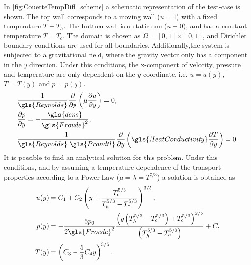 In \cref{fig:CouetteTempDiff_scheme} a schematic representation of the test-case is shown. The top wall corresponds to a moving wall ($u = 1$) with a fixed temperature $T=T_h$. The bottom wall is a static one ($u = 0$), and has a constant temperature $T = T_c$. 
The domain is chosen as $\Omega = [0,1]\times[0,1]$, and Dirichlet boundary conditions are used for all boundaries. Additionally,the system is subjected to a gravitational field, where the gravity vector only has a component in the $y$ direction. Under this conditions, the x-component of velocity, pressure and temperature are only dependent on the $y$ coordinate, i.e. $u = u(y)$, $T = T(y)$ and $p = p(y)$. %
\begin{align}
&\frac{1}{\gls{Reynolds}} \pfrac{ }{y}\left(\mu\pfrac{u}{y}\right) = 0,\\
&\pfrac{p}{y} = -\frac{\gls{dens}}{\gls{Froude}^2},\\
&\frac{1}{\gls{Reynolds}~\gls{Prandtl}} \pfrac{ }{y}\left(\gls{HeatConductivity}\pfrac{T}{y}\right) = 0.
\end{align}
It is possible to find an analytical solution for this problem.
Under this conditions, and by assuming a temperature dependence of the transport properties according to a Power Law ($\mu = \lambda = T^{2/3}$) a solution is obtained as 
\begin{subequations}
\begin{align}
	u(y) &= C_1 + C_2\left(y + \frac{T_c^{5/3}}{T_h^{5/3}-T_c^{5/3}} \right)^{3/5},\label{eq:CouetteU}\\
	p(y) &= -\frac{5p_0}{2\gls{Froude}^2}\frac{\left(y\left(T_h^{5/3}-T_c^{5/3}\right)+T_c^{5/3}\right)^{2/5}}{\left(T_h^{5/3}-T_c^{5/3}\right)}+C,\label{eq:Couettep}\\
	T(y) &= \left(C_3 - \frac{5}{3}C_4 y\right)^{3/5}\label{eq:CouetteT}.
\end{align} 
\end{subequations}
